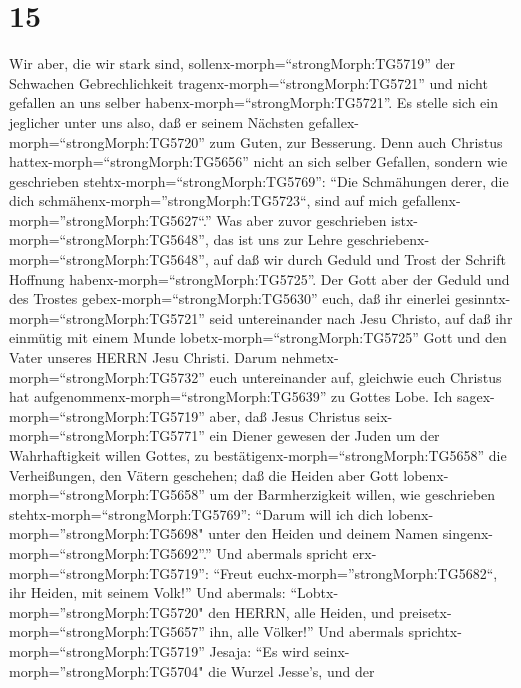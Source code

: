 \hypertarget{section-14}{%
\section{15}\label{section-14}}

 Wir aber, die wir stark sind,
sollenx-morph=``strongMorph:TG5719'' der Schwachen Gebrechlichkeit
tragenx-morph=``strongMorph:TG5721'' und nicht gefallen an uns selber
habenx-morph=``strongMorph:TG5721''.  Es stelle sich ein
jeglicher unter uns also, daß er seinem Nächsten
gefallex-morph=``strongMorph:TG5720'' zum Guten, zur Besserung.
 Denn auch Christus hattex-morph=``strongMorph:TG5656''
nicht an sich selber Gefallen, sondern wie geschrieben
stehtx-morph=``strongMorph:TG5769'': ``Die Schmähungen derer, die dich
schmähenx-morph=''strongMorph:TG5723``, sind auf mich
gefallenx-morph=''strongMorph:TG5627``.''  Was aber zuvor
geschrieben istx-morph=``strongMorph:TG5648'', das ist uns zur Lehre
geschriebenx-morph=``strongMorph:TG5648'', auf daß wir durch Geduld und
Trost der Schrift Hoffnung habenx-morph=``strongMorph:TG5725''.
 Der Gott aber der Geduld und des Trostes
gebex-morph=``strongMorph:TG5630'' euch, daß ihr einerlei
gesinntx-morph=``strongMorph:TG5721'' seid untereinander nach Jesu
Christo,  auf daß ihr einmütig mit einem Munde
lobetx-morph=``strongMorph:TG5725'' Gott und den Vater unseres HERRN
Jesu Christi.  Darum nehmetx-morph=``strongMorph:TG5732''
euch untereinander auf, gleichwie euch Christus hat
aufgenommenx-morph=``strongMorph:TG5639'' zu Gottes Lobe. 
Ich sagex-morph=``strongMorph:TG5719'' aber, daß Jesus Christus
seix-morph=``strongMorph:TG5771'' ein Diener gewesen der Juden um der
Wahrhaftigkeit willen Gottes, zu
bestätigenx-morph=``strongMorph:TG5658'' die Verheißungen, den Vätern
geschehen;  daß die Heiden aber Gott
lobenx-morph=``strongMorph:TG5658'' um der Barmherzigkeit willen, wie
geschrieben stehtx-morph=``strongMorph:TG5769'': ``Darum will ich dich
lobenx-morph=''strongMorph:TG5698" unter den Heiden und deinem Namen
singenx-morph=``strongMorph:TG5692''.''  Und abermals
spricht erx-morph=``strongMorph:TG5719'': ``Freut
euchx-morph=''strongMorph:TG5682``, ihr Heiden, mit seinem Volk!''
 Und abermals: ``Lobtx-morph=''strongMorph:TG5720" den
HERRN, alle Heiden, und preisetx-morph=``strongMorph:TG5657'' ihn, alle
Völker!''  Und abermals
sprichtx-morph=``strongMorph:TG5719'' Jesaja: ``Es wird
seinx-morph=''strongMorph:TG5704" die Wurzel Jesse's, und der
